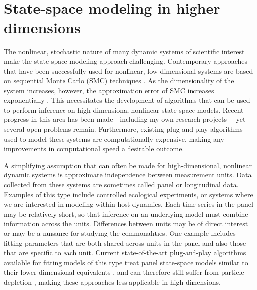 \documentclass{article}
\begin{document}
\section{State-space modeling in higher dimensions}\label{sec:methods}

The nonlinear, stochastic nature of many dynamic systems of scientific interest make the state-space modeling approach challenging.
Contemporary approaches that have been successfully used for nonlinear, low-dimensional systems are based on sequential Monte Carlo (SMC) techniques \cite{ionides06,andrieu10,ionides15}.
As the dimensionality of the system increases, however, the approximation error of SMC increases exponentially \cite{bengtsson08,snyder08}.
This necessitates the development of algorithms that can be used to perform inference on high-dimensional nonlinear state-space models.
Recent progress in this area has been made---including my own research projects \cite{ionides22,wheeler24}---yet several open problems remain.
Furthermore, existing plug-and-play algorithms used to model these systems are computationally expensive, making any improvements in computational speed a desirable outcome.

A simplifying assumption that can often be made for high-dimensional, nonlinear dynamic systems is approximate independence between measurement units.
Data collected from these systems are sometimes called panel or longitudinal data.
Examples of this type include controlled ecological experiments, or systems where we are interested in modeling within-host dynamics.
Each time-series in the panel may be relatively short, so that inference on an underlying model must combine information across the units.
Differences between units may be of direct interest or may be a nuisance for studying the commonalities.
One example includes fitting parameters that are both shared across units in the panel and also those that are specific to each unit.
Current state-of-the-art plug-and-play algorithms available for fitting models of this type treat panel state-space models similar to their lower-dimensional equivalents \cite{breto20}, and can therefore still suffer from particle depletion \cite{snyder08}, making these approaches less applicable in high dimensions.
\end{document}
